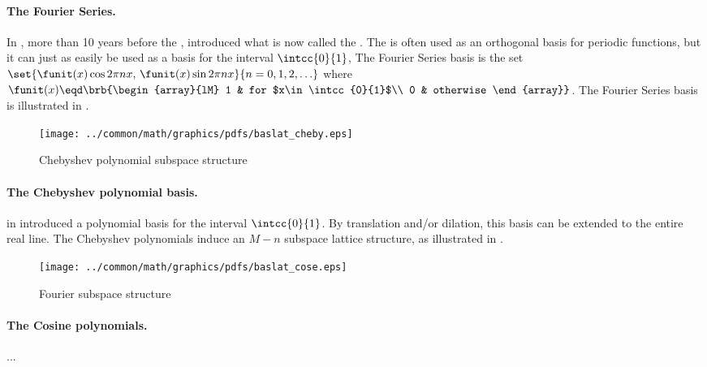 \paragraph{The Fourier Series.}
In \citeyear{fourier1807}, more than 10 years before the ,
\citeauthor{fourier1807} introduced what is now called the .
The  is often used as an orthogonal basis for periodic functions,
but it can just as easily be used as a   basis for the interval $\intcc{0}{1}$,
The Fourier Series basis is the set
\quad$\set{\funit(x)\cos 2\pi nx,\, \funit(x)\sin 2\pi nx}{n=0,1,2,\ldots}$\quad
where 
\quad$\funit(x)\eqd\brb{\begin{array}{lM}
  1 & for $x\in\intcc{0}{1}$\\
  0 & otherwise
\end{array}}$.\quad
The Fourier Series basis is illustrated in .

\begin{figure}[h]
  \gsize%
  \centering%
  \texttt{[image: ../common/math/graphics/pdfs/baslat\_cheby.eps]}%
  \caption{Chebyshev polynomial subspace structure \label{fig:baslat_cheby}}
\end{figure}
\paragraph{The Chebyshev polynomial basis.}
\citeauthor{chebyshev1854} in \citeyear{chebyshev1854} introduced a polynomial basis for the interval $\intcc{0}{1}$.\footnotemark
By translation and/or dilation, this basis can be extended to the entire real line.
The Chebyshev polynomials induce an $M-n$ subspace lattice structure, as illustrated in .

\begin{figure}[h]
  \gsize%
  \centering%
  \texttt{[image: ../common/math/graphics/pdfs/baslat\_cose.eps]}%
  \caption{Fourier subspace structure \label{fig:baslat_cose}}
\end{figure}
\paragraph{The Cosine polynomials.} ...


